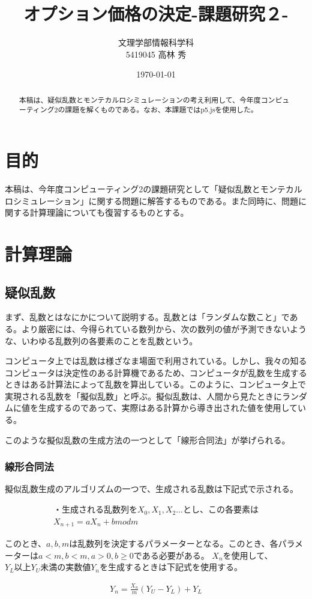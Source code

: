 \documentclass[dvipdfmx]{jsarticle}
\title{オプション価格の決定-課題研究２-}
\author{文理学部情報科学科\\5419045 高林 秀}
\date{\today}
\begin{document}
\maketitle

\begin{abstract}
本稿は、疑似乱数とモンテカルロシミュレーションの考え利用して、今年度コンピューティング2の課題を解くものである。なお、本課題ではp5.jsを使用した。
\end{abstract}

\section{目的}
本稿は、今年度コンピューティング2の課題研究として「疑似乱数とモンテカルロシミュレーション」に関する問題に解答するものである。また同時に、問題に関する計算理論についても復習するものとする。
\section{計算理論}
\subsection{疑似乱数}
まず、乱数とはなにかについて説明する。乱数とは「ランダムな数こと」である。より厳密には、今得られている数列から、次の数列の値が予測できないような、いわゆる乱数列の各要素のことを乱数という。\par
コンピュータ上では乱数は様ざなま場面で利用されている。しかし、我々の知るコンピュータは決定性のある計算機であるため、コンピュータが乱数を生成するときはある計算法によって乱数を算出している。このように、コンピュータ上で実現される乱数を「擬似乱数」と呼ぶ。擬似乱数は、人間から見たときにランダムに値を生成するのであって、実際はある計算から導き出された値を使用している。\par
このような擬似乱数の生成方法の一つとして「線形合同法」が挙げられる。
\subsubsection{線形合同法}
擬似乱数生成のアルゴリズムの一つで、生成される乱数は下記式で示される。
\begin{center}
  \begin{align*}
    ・生成される乱数列をX_{0}, X_{1}, X_{2}...とし、この各要素は\\
    X_{n+1} = aX_{n} + b mod m
  \end{align*}
\end{center}
このとき、$a, b, m$は乱数列を決定するパラメーターとなる。このとき、各パラメーターは$a < m, b < m, a > 0, b \geq 0$である必要がある。
$X_{n}$を使用して、$Y_{L}以上Y_{U}未満の実数値Y_{n}$を生成するときは下記式を使用する。
\begin{center}
  \begin{align*}
    Y_{n} = \frac{X_{n}}{m}(Y_{U}-Y_{L})+Y_{L}
  \end{align*}
\end{center}
\end{document}
